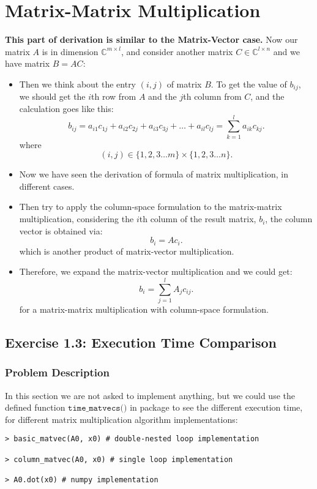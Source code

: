 \section{Matrix-Matrix Multiplication}%
\textbf{This part of derivation is similar to the Matrix-Vector case.} Now our matrix $A$ is in dimension $\mathbb{C}^{m \times l}$, and consider another matrix $C \in \mathbb{C}^{l \times n}$ and we have matrix $B = AC$:
\begin{itemize}
  \item Then we think about the entry $(i, j)$ of matrix $B$. To get the value of $b_{ij}$, we should get the $i$th row from $A$ and the $j$th column from $C$, and the calculation goes like this:
    \[
      b_{ij} = a_{i1}c_{1j} + a_{i2}c_{2j} + a_{i3}c_{3j} + \ldots +  a_{il}c_{lj} = \sum_{k = 1}^{l} a_{ik}c_{kj}
    .\] 
    where
    \[
      (i, j) \in \{1, 2, 3 \ldots m\} \times \{1, 2, 3 \ldots n\} 
    .\]
    \item Now we have seen the derivation of formula of matrix multiplication, in different cases.
    \item Then try to apply the column-space formulation to the matrix-matrix multiplication, considering the $i$th column of the result matrix, $b_i$, the column vector is obtained via:
    \[
    b_i = A c_i
    .\] 
    which is another product of matrix-vector multiplication.
    \item Therefore, we expand the matrix-vector multiplication and we could get:
    \[
    b_i = \sum_{j=1}^{l} A_j c_{ij}
    .\]
    for a matrix-matrix multiplication with column-space formulation.

\end{itemize}
\subsection*{Exercise 1.3: Execution Time Comparison}%
\subsubsection*{Problem Description}
In this section we are not asked to implement anything, but we could use the defined function $\texttt{time\_matvecs()}$ in package to see the different execution time, for different matrix multiplication algorithm implementations:
\begin{lstlisting}
> basic_matvec(A0, x0) # double-nested loop implementation

> column_matvec(A0, x0) # single loop implementation

> A0.dot(x0) # numpy implementation
\end{lstlisting}
